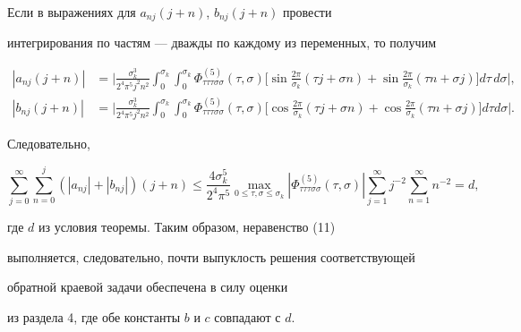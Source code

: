 Если в выражениях для $a_{nj}(j + n)$, $b_{nj}(j + n)$ провести


интегрирования по частям --- дважды по каждому из переменных, то получим


\begin{align*}


|a_{nj} (j + n)| &= \bigg|\frac{\sigma_k^3}{2^4\pi^5 j^2 n^2} \int_0^{\sigma_k}


\int_0^{\sigma_k} \Phi^{(5)}_{\tau\tau\tau\sigma\sigma}(\tau,\sigma)


\bigg[\sin\frac{2\pi}{\sigma_k} (\tau j + \sigma n) + 


\sin \frac{2\pi}{\sigma_k} (\tau n + \sigma j)\bigg] d\tau\,d\sigma\bigg|,\\


%


|b_{nj} (j + n)| &= \bigg|\frac{\sigma_k^3}{2^4\pi^5 j^2 n^2} \int_0^{\sigma_k}


\int_0^{\sigma_k} \Phi^{(5)}_{\tau\tau\tau\sigma\sigma}(\tau,\sigma)


\bigg[\cos\frac{2\pi}{\sigma_k} (\tau j + \sigma n) +


\cos \frac{2\pi}{\sigma_k} (\tau n + \sigma j)\bigg] d\tau d\sigma\bigg|.


\end{align*}


Следовательно,


$$


\sum_{j = 0}^{\infty} \sum_{n = 0}^j (|a_{nj}| + |b_{nj}|)(j + n)


\leq


\frac{4 \sigma_k^5}{2^4 \pi^5} \max_{0 \leq \tau,\sigma \leq


\sigma_k} |\Phi^{(5)}_{\tau\tau\tau\sigma\sigma}(\tau,\sigma)|


\sum_{j=1}^{\infty} j^{-2} \sum_{n=1}^{\infty} n^{-2} = d,


$$


где $d$ из условия теоремы. Таким образом, неравенство (11)


выполняется, следовательно, почти выпуклость решения соответствующей


обратной краевой задачи обеспечена в силу оценки


из раздела 4, где обе константы $b$ и $c$ совпадают с $d$.





